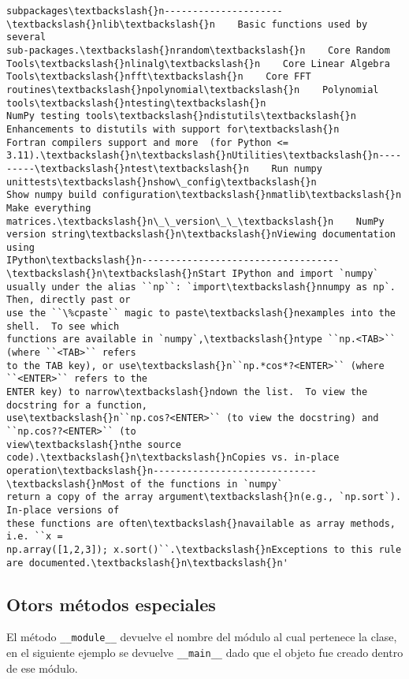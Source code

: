 \begin{tcolorbox}[breakable, size=fbox, boxrule=.5pt, pad at break*=1mm, opacityfill=0]
\begin{Verbatim}[commandchars=\\\{\}]
subpackages\textbackslash{}n---------------------\textbackslash{}nlib\textbackslash{}n    Basic functions used by several
sub-packages.\textbackslash{}nrandom\textbackslash{}n    Core Random Tools\textbackslash{}nlinalg\textbackslash{}n    Core Linear Algebra
Tools\textbackslash{}nfft\textbackslash{}n    Core FFT routines\textbackslash{}npolynomial\textbackslash{}n    Polynomial tools\textbackslash{}ntesting\textbackslash{}n
NumPy testing tools\textbackslash{}ndistutils\textbackslash{}n    Enhancements to distutils with support for\textbackslash{}n
Fortran compilers support and more  (for Python <=
3.11).\textbackslash{}n\textbackslash{}nUtilities\textbackslash{}n---------\textbackslash{}ntest\textbackslash{}n    Run numpy unittests\textbackslash{}nshow\_config\textbackslash{}n
Show numpy build configuration\textbackslash{}nmatlib\textbackslash{}n    Make everything
matrices.\textbackslash{}n\_\_version\_\_\textbackslash{}n    NumPy version string\textbackslash{}n\textbackslash{}nViewing documentation using
IPython\textbackslash{}n-----------------------------------\textbackslash{}n\textbackslash{}nStart IPython and import `numpy`
usually under the alias ``np``: `import\textbackslash{}nnumpy as np`.  Then, directly past or
use the ``\%cpaste`` magic to paste\textbackslash{}nexamples into the shell.  To see which
functions are available in `numpy`,\textbackslash{}ntype ``np.<TAB>`` (where ``<TAB>`` refers
to the TAB key), or use\textbackslash{}n``np.*cos*?<ENTER>`` (where ``<ENTER>`` refers to the
ENTER key) to narrow\textbackslash{}ndown the list.  To view the docstring for a function,
use\textbackslash{}n``np.cos?<ENTER>`` (to view the docstring) and ``np.cos??<ENTER>`` (to
view\textbackslash{}nthe source code).\textbackslash{}n\textbackslash{}nCopies vs. in-place
operation\textbackslash{}n-----------------------------\textbackslash{}nMost of the functions in `numpy`
return a copy of the array argument\textbackslash{}n(e.g., `np.sort`).  In-place versions of
these functions are often\textbackslash{}navailable as array methods, i.e. ``x =
np.array([1,2,3]); x.sort()``.\textbackslash{}nExceptions to this rule are documented.\textbackslash{}n\textbackslash{}n'
\end{Verbatim}
\end{tcolorbox}
        
\subsection{Otors métodos especiales}

El método \texttt{\_\_module\_\_} devuelve el nombre del módulo al cual
pertenece la clase, en el siguiente ejemplo se devuelve
\texttt{\_\_main\_\_} dado que el objeto fue creado dentro de ese
módulo.

